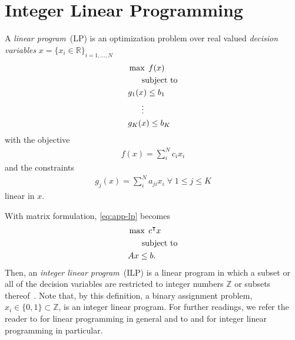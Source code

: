 \chapter{Integer Linear Programming}
\label{cha:app-ilp}

\begin{mydef}
    A \emph{linear program}~(LP) is an optimization problem over real valued \emph{decision variables}
    $x=\{x_i \in \mathbb{R}\}_{i=1,\hdots,N}$
    \begin{align}
        \label{eq:app-lp}
        &\max \; f(x) \\\nonumber
        &\;\;\;\;\;\; \textnormal{subject to} \\ \nonumber
        &g_1(x) \le b_1 \\ \nonumber
        &\;\;\;\;\;\; \vdots \\\nonumber
        &g_K(x) \le b_K
    \end{align}
    with the objective
    \begin{align}
        f(x) = \sum_i^Nc_ix_i
    \end{align}
    and the constraints
    \begin{align}
        g_j(x) = \sum_i^Na_{ji}x_i \; \forall \; 1 \le j \le K
    \end{align}
    linear in $x$.
\end{mydef}

With matrix formulation, \cref{eq:app-lp} becomes
\begin{align}
    &\max \; c^{\intercal}x \\\nonumber
    &\;\;\;\;\;\; \textnormal{subject to} \\ \nonumber
    &  Ax \le b.
\end{align}
Then, an \emph{integer linear program}~(ILP) is a linear program in which a subset or all of the
decision variables are restricted to integer numbers $\mathbb{Z}$ or subsets
thereof~\citep[385]{vanderbei_07_linear}. Note that, by this definition, a binary assignment
problem, $x_i\in\{0,1\} \subset \mathbb{Z}$, is an integer linear program. For further readings, we
refer the reader to \citet{vanderbei_07_linear, padberg_10_linear} for linear programming in general
and to \citet[Chapter~5]{cook_12_pursuit} and \citet[Chapter~23]{vanderbei_07_linear} for integer
linear programming in particular.

